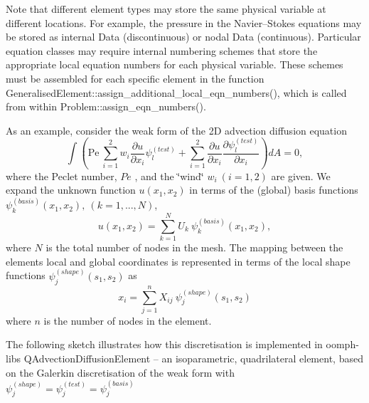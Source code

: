 Note that different element types may store the same physical variable at different locations. For example, the pressure in the Navier--Stokes equations may be stored as internal {\ttfamily Data} (discontinuous) or nodal {\ttfamily Data} (continuous). Particular equation classes may require internal numbering schemes that store the appropriate local equation numbers for each physical variable. These schemes must be assembled for each specific element in the function {\ttfamily Generalised\+Element\+::assign\+\_\+additional\+\_\+local\+\_\+eqn\+\_\+numbers()}, which is called from within {\ttfamily Problem\+::assign\+\_\+eqn\+\_\+numbers()}.

As an example, consider the weak form of the 2D advection diffusion equation \[ \int \left(\mbox{Pe} \ \sum_{i=1}^2 w_i \frac{\partial u}{\partial x_i} \psi^{(test)}_l + \sum_{i=1}^2 \frac{\partial u}{\partial x_i} \frac{\partial \psi^{(test)}_l}{\partial x_i} \right) dA = 0, \] where the Peclet number, $ Pe $ , and the \char`\"{}wind\char`\"{} $w_i \ (i=1,2)$ are given. We expand the unknown function $u(x_1,x_2)$ in terms of the (global) basis functions $ \psi^{(basis)}_k(x_1,x_2), \ (k=1,...,N)$, \[ u(x_1,x_2) = \sum_{k=1}^N U_k \ \psi^{(basis)}_k(x_1,x_2), \] where $N$ is the total number of nodes in the mesh. The mapping between the element\textquotesingle{}s local and global coordinates is represented in terms of the local shape functions $\psi^{(shape)}_j(s_1,s_2)$ as \[ x_i = \sum_{j=1}^n X_{ij} \ \psi^{(shape)}_j(s_1,s_2) \] where $ n $ is the number of nodes in the element.

The following sketch illustrates how this discretisation is implemented in {\ttfamily oomph-\/lib\textquotesingle{}s} {\ttfamily Q\+Advection\+Diffusion\+Element} -- an isoparametric, quadrilateral element, based on the Galerkin discretisation of the weak form with $ \psi^{(shape)}_j = \psi^{(test)}_j = \psi^{(basis)}_j $

